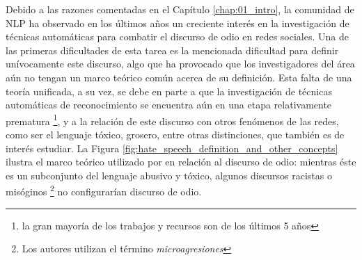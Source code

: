 Debido a las razones comentadas en el Capítulo \ref{chap:01_intro}, la comunidad de NLP ha observado en los últimos años un creciente interés en la investigación de técnicas automáticas para combatir el discurso de odio en redes sociales. Una de las primeras dificultades de esta tarea es la mencionada dificultad para definir unívocamente este discurso, algo que ha provocado que los investigadores del área aún no tengan un marco teórico común acerca de su definición. Esta falta de una teoría unificada, a su vez, se debe en parte a que la investigación de técnicas automáticas de reconocimiento se encuentra aún en una etapa relativamente prematura \footnote{la gran mayoría de los trabajos y recursos son de los últimos 5 años}, y a la relación de este discurso con otros fenómenos de las redes, como ser el lenguaje tóxico, grosero, entre otras distinciones, que también es de interés estudiar. La Figura \ref{fig:hate_speech_definition_and_other_concepts} ilustra el marco teórico utilizado por \citet{poletto2021resources} en relación al discurso de odio: mientras éste es un subconjunto del lenguaje abusivo y tóxico, algunos discursos racistas o misóginos \footnote{Los autores utilizan el término \emph{microagresiones}} no configurarían discurso de odio.



